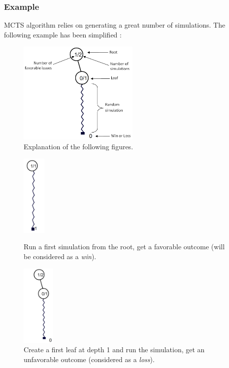 \subsubsection{Example}
MCTS algorithm relies on generating a great number of simulations. The following example has been simplified :
\label{sec:example}
\begin{figure}[H]
\centering
\includegraphics[height=5cm]{1_Presentation/1.2_Algorithm_MCTS_Benoit/img/schema.png}
\caption{\label{fig:schema}Explanation of the following figures.}
\end{figure}

\begin{figure}[H]
\centering
	\begin{minipage}[b]{0.45\linewidth}
		\centering
		\includegraphics[height=4cm]{1_Presentation/1.2_Algorithm_MCTS_Benoit/img/1.png}
		\caption{\label{fig:1}Run a first simulation from the root, get a favorable outcome (will be considered as a \textit{win}).}
	\end{minipage}%
	\hspace*{1cm}
	\begin{minipage}[b]{0.45\linewidth}
		\centering
		\includegraphics[height=4cm]{1_Presentation/1.2_Algorithm_MCTS_Benoit/img/2.png}
		\caption{\label{fig:2}Create a first leaf at depth 1 and run the simulation, get an unfavorable outcome (considered as a \textit{loss}).}
	\end{minipage}%
\end{figure}

